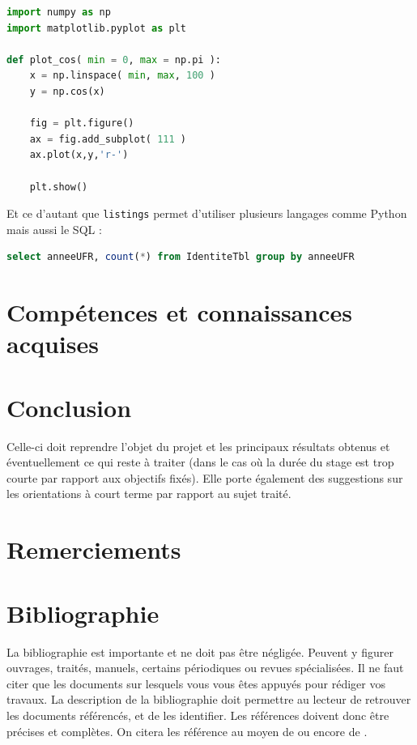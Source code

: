 \documentclass{ipgplicence}
\begin{document}
\begin{lstlisting}[language=python]
import numpy as np
import matplotlib.pyplot as plt

def plot_cos( min = 0, max = np.pi ):
    x = np.linspace( min, max, 100 )
    y = np.cos(x)

    fig = plt.figure()
    ax = fig.add_subplot( 111 )
    ax.plot(x,y,'r-')

    plt.show()
\end{lstlisting} 

Et ce d'autant que \texttt{listings} permet d'utiliser plusieurs langages comme Python mais aussi le SQL :
\begin{lstlisting}[language=sql]
select anneeUFR, count(*) from IdentiteTbl group by anneeUFR
\end{lstlisting}

\section{Compétences et connaissances acquises}

\section{Conclusion}

Celle-ci doit reprendre l’objet du projet et les principaux résultats obtenus et éventuellement ce qui reste à traiter (dans le cas où la durée du stage est trop courte par rapport aux objectifs fixés). Elle porte également des suggestions sur les orientations à court terme par rapport au sujet traité. 

\section{Remerciements}

\section{Bibliographie}

La bibliographie est importante  et ne doit pas être négligée. Peuvent y figurer ouvrages, traités, manuels, certains périodiques ou revues spécialisées. Il ne faut citer que les documents sur lesquels vous vous êtes appuyés pour rédiger vos travaux. La description de la bibliographie doit permettre au lecteur de retrouver les documents référencés, et de les identifier. Les références doivent donc être précises et complètes. On citera les référence au moyen de \cite{Ref1} ou encore de \cite{Ref2,Ref3}.
\end{document}
